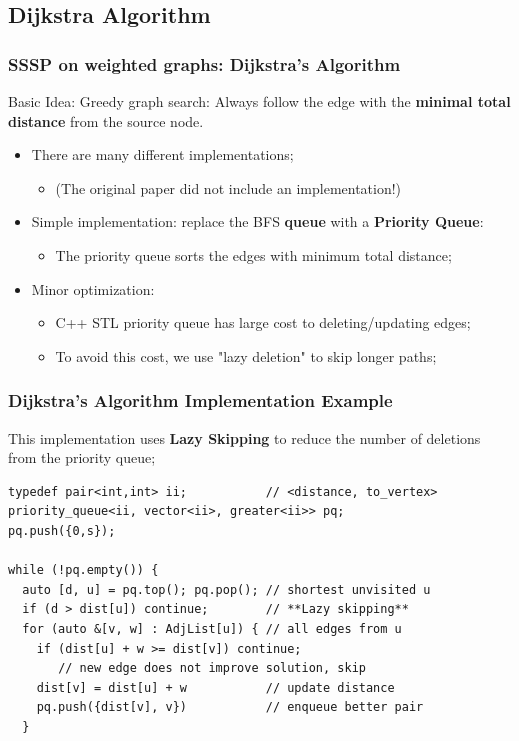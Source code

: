 \subsection{Dijkstra Algorithm}
\begin{frame}
  \frametitle{SSSP on weighted graphs: Dijkstra's Algorithm}
  \begin{block}{Basic Idea:}
    Greedy graph search: Always follow the edge with the {\bf minimal total distance} from the source node.
  \end{block}\bigskip

  \begin{itemize}
  \item There are many different implementations;
  \begin{itemize}
    \item (The original paper did not include an implementation!)
  \end{itemize}\bigskip

  \item Simple implementation: replace the BFS {\bf queue} with a {\bf Priority Queue}:
  \begin{itemize}
    \item The priority queue sorts the edges with minimum total distance;
  \end{itemize}\bigskip

  \item Minor optimization:
  \begin{itemize}
    \item C++ STL priority queue has large cost to deleting/updating edges;
    \item To avoid this cost, we use "lazy deletion" to skip longer paths;
  \end{itemize}
  \end{itemize}

\end{frame}

\begin{frame}[fragile]
  \frametitle{Dijkstra's Algorithm Implementation Example}

  This implementation uses {\bf Lazy Skipping} to reduce the number of deletions from the priority queue;

  {\smaller
    \begin{exampleblock}{}
\begin{verbatim}
typedef pair<int,int> ii;           // <distance, to_vertex>
priority_queue<ii, vector<ii>, greater<ii>> pq;
pq.push({0,s});

while (!pq.empty()) {
  auto [d, u] = pq.top(); pq.pop(); // shortest unvisited u
  if (d > dist[u]) continue;        // **Lazy skipping**
  for (auto &[v, w] : AdjList[u]) { // all edges from u
    if (dist[u] + w >= dist[v]) continue;
       // new edge does not improve solution, skip
    dist[v] = dist[u] + w           // update distance
    pq.push({dist[v], v})           // enqueue better pair
  }
\end{verbatim}
    \end{exampleblock}}
\end{frame}

